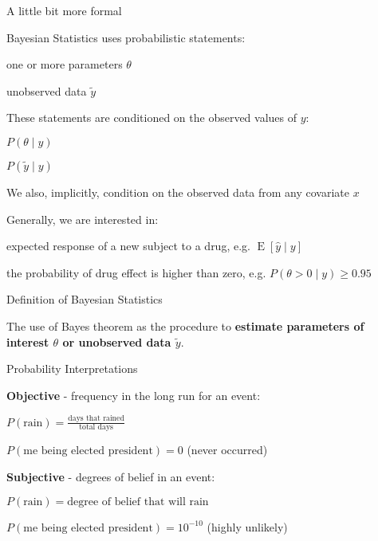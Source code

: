 \begin{frame}{A little bit more formal}
	\begin{vfilleditems}
		\item Bayesian Statistics uses probabilistic statements:
		\begin{vfilleditems}
			\item one or more parameters $\theta$
			\item unobserved data $\tilde{y}$
		\end{vfilleditems}
		\item These statements are conditioned on the observed values of $y$:
		\begin{vfilleditems}
			\item $P(\theta \mid y)$
			\item $P(\tilde{y} \mid y)$
		\end{vfilleditems}
		\item We also, implicitly, condition on the observed data from
		any covariate $x$
		\item Generally, we are interested in:
		\begin{vfilleditems}
			\item expected response of a new subject to a drug,
			e.g. $\operatorname{E}[\hat{y} \mid y]$
			\item the probability of drug effect is higher than zero,
			e.g. $P(\theta > 0 \mid y) \geq 0.95$

		\end{vfilleditems}
	\end{vfilleditems}
\end{frame}

\begin{frame}{Definition of Bayesian Statistics}
	\begin{defn}
		The use of Bayes theorem as the procedure to \textbf{estimate
			parameters of interest $\theta$ or unobserved data $\tilde{y}$}.
		\parencite{gelman2013bayesian}
	\end{defn}
\end{frame}

\begin{frame}{Probability Interpretations}
	\begin{vfilleditems}
		\item \textbf{Objective} - frequency in the long run for an event:
		\begin{vfilleditems}
			\item $P(\text{rain}) = \frac{\text{days that rained}}{\text{total days}}$
			\item $P(\text{me being elected president}) = 0$ (never occurred)
		\end{vfilleditems}
		\item \textbf{Subjective} - degrees of belief in an event:
		\begin{vfilleditems}
			\item $P(\text{rain}) = \text{degree of belief that will rain}$
			\item $P(\text{me being elected president}) = 10^{-10}$ (highly unlikely)
		\end{vfilleditems}
	\end{vfilleditems}
\end{frame}

